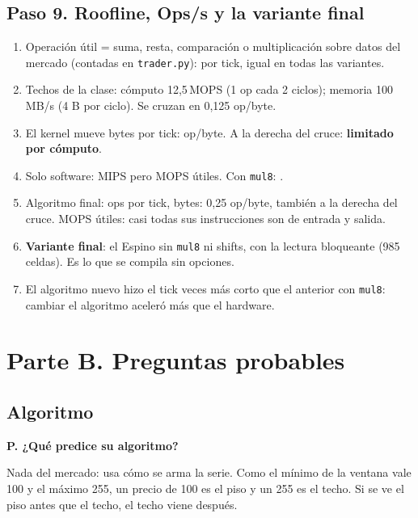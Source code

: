 \documentclass[11pt,letterpaper]{article}
\newcounter{preg}
\newcommand{\preg}[1]{\stepcounter{preg}\par\medskip\noindent\textbf{P\thepreg. #1}\par\noindent}
\begin{document}
\subsection*{Paso 9. Roofline, Ops/s y la variante final}
\begin{enumerate}
\item Operación útil = suma, resta, comparación o multiplicación sobre datos del mercado (contadas en
  \texttt{trader.py}): \OpsTick{} por tick, igual en todas las variantes.
\item Techos de la clase: cómputo 12,5\,MOPS (1 op cada 2 ciclos); memoria 100\,MB/s (4 B por ciclo).
  Se cruzan en 0,125 op/byte.
\item El kernel mueve \BytesTick{} bytes por tick: \IntensidadOp{} op/byte. A la derecha del cruce:
  \textbf{limitado por cómputo}.
\item Solo software: \MIPSSw{} MIPS pero \MopsSw{} MOPS útiles. Con \texttt{mul8}: \MopsMul.
\item Algoritmo final: \ExtOpsTick{} ops por tick, \ExtBytesTick{} bytes: 0,25 op/byte, también a la
  derecha del cruce. \ExtMops{} MOPS útiles: casi todas sus instrucciones son de entrada y salida.
\item \textbf{Variante final}: el Espino sin \texttt{mul8} ni shifts, con la lectura bloqueante (985 celdas).
  Es lo que se compila sin opciones.
\item El algoritmo nuevo hizo el tick \ExtSpeedupMul{} veces más corto que el anterior con \texttt{mul8}:
  cambiar el algoritmo aceleró más que el hardware.
\end{enumerate}

\section*{Parte B. Preguntas probables}

\subsection*{Algoritmo}
\preg{¿Qué predice su algoritmo?}
Nada del mercado: usa cómo se arma la serie. Como el mínimo de la ventana vale 100 y el máximo 255, un
precio de 100 es el piso y un 255 es el techo. Si se ve el piso antes que el techo, el techo viene
después.
\end{document}
